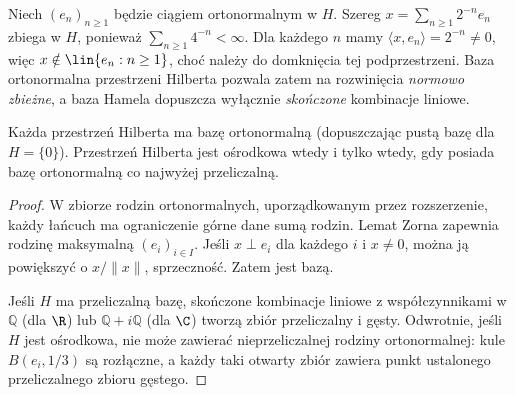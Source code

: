 \begin{przyklad}
\label{ex:hilbert-series-not-hamel13}
Niech $(e_n)_{n\ge1}$ będzie ciągiem ortonormalnym w $H$.
Szereg $x=\sum_{n\ge1}2^{-n}e_n$ zbiega w $H$, ponieważ
$\sum_{n\ge1}4^{-n}<\infty$. Dla każdego $n$ mamy
$\langle x,e_n\rangle=2^{-n}\ne0$, więc
$x\notin\lin\{e_n:n\ge1\}$, choć należy do domknięcia
tej podprzestrzeni. Baza ortonormalna przestrzeni Hilberta pozwala zatem na rozwinięcia
\emph{normowo zbieżne}, a baza Hamela dopuszcza wyłącznie
\emph{skończone} kombinacje liniowe.
\end{przyklad}

\begin{twierdzenie}
\label{thm:hilbert-basis13}
Każda przestrzeń Hilberta ma bazę ortonormalną (dopuszczając pustą
bazę dla $H=\{0\}$). Przestrzeń Hilberta jest ośrodkowa wtedy i tylko
wtedy, gdy posiada bazę ortonormalną co najwyżej przeliczalną.
\end{twierdzenie}
\begin{proof}
W zbiorze rodzin ortonormalnych, uporządkowanym przez rozszerzenie,
każdy łańcuch ma ograniczenie górne dane sumą rodzin.
Lemat Zorna zapewnia rodzinę maksymalną $(e_i)_{i\in I}$.
Jeśli $x\perp e_i$ dla każdego $i$ i $x\ne0$, można ją powiększyć
o $x/\|x\|$, sprzeczność. Zatem jest bazą.

Jeśli $H$ ma przeliczalną bazę, skończone kombinacje liniowe z
współczynnikami w $\mathbb Q$ (dla $\R$) lub
$\mathbb Q+i\mathbb Q$ (dla $\C$) tworzą zbiór przeliczalny i gęsty.
Odwrotnie, jeśli $H$ jest ośrodkowa, nie może zawierać
nieprzeliczalnej rodziny ortonormalnej: kule
$B(e_i,1/3)$ są rozłączne, a każdy taki otwarty zbiór zawiera
punkt ustalonego przeliczalnego zbioru gęstego.
\end{proof}


